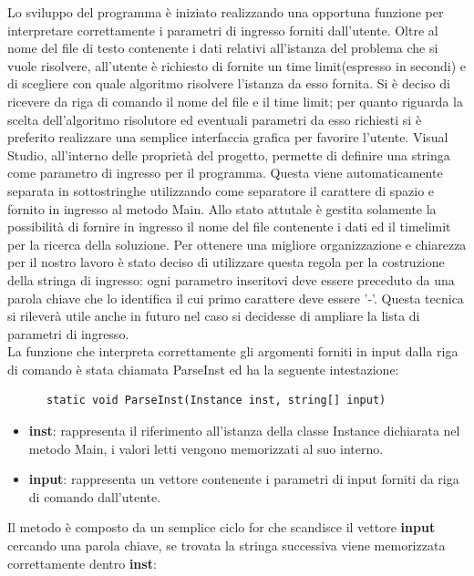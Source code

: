 \documentclass[11pt]{article}
\begin{document}
Lo sviluppo del programma è iniziato realizzando una opportuna funzione per interpretare correttamente i parametri di ingresso forniti dall'utente. Oltre al nome del file di testo contenente i dati relativi  all'istanza del problema che si vuole risolvere, all'utente è richiesto di fornite un time limit(espresso in secondi) e di scegliere con quale algoritmo risolvere l'istanza da esso fornita. Si è deciso di ricevere da riga di comando il nome del file e il time limit; per quanto riguarda la scelta dell'algoritmo risolutore ed eventuali parametri da esso richiesti si è preferito realizzare una semplice interfaccia grafica per favorire l'utente. 
Visual Studio, all'interno delle proprietà del progetto, permette di definire una stringa come parametro di ingresso per il programma. Questa viene automaticamente separata in sottostringhe utilizzando come separatore il carattere di spazio e fornito in ingresso al metodo Main. Allo stato attutale è gestita solamente la possibilità di fornire in ingresso il nome del file contenente i dati ed il timelimit per la ricerca della soluzione. Per ottenere una migliore organizzazione e chiarezza per il nostro lavoro è stato deciso di utilizzare questa regola per la costruzione della stringa di ingresso: ogni parametro inseritovi deve essere preceduto da una parola chiave che lo identifica il cui primo carattere deve essere '-'. Questa tecnica si rileverà utile anche in futuro nel caso si decidesse di ampliare la lista di parametri di ingresso.\\
La funzione che interpreta correttamente gli argomenti forniti in input dalla riga di comando è stata chiamata ParseInst ed ha la seguente intestazione:

\begin{lstlisting}
      static void ParseInst(Instance inst, string[] input) 
\end{lstlisting}


\begin{itemize}
\item \textbf{inst}: rappresenta il riferimento all'istanza della classe Instance dichiarata nel metodo Main, i valori letti vengono memorizzati al suo interno.
\item \textbf{input}: rappresenta un vettore contenente i parametri di input forniti da riga di comando dall'utente.
\end{itemize}


Il metodo è composto da un semplice ciclo for che scandisce il vettore \textbf{input} cercando una parola chiave, se trovata la stringa successiva viene memorizzata correttamente dentro \textbf{inst}: 
\end{document}
